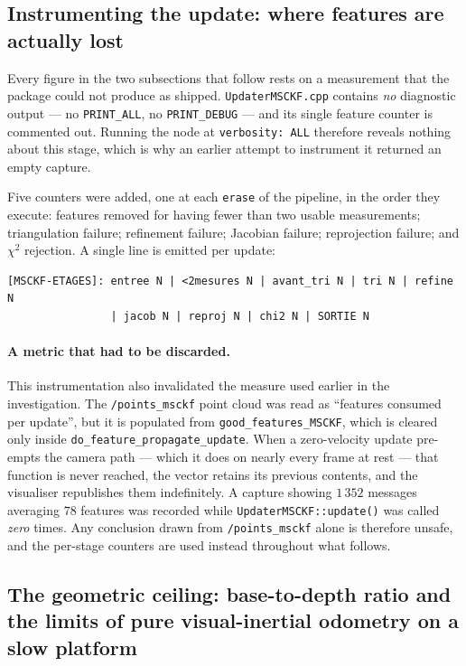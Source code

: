 \subsection{Instrumenting the update: where features are actually lost}
\label{ssec:etages}

Every figure in the two subsections that follow rests on a measurement that
the package could not produce as shipped. \texttt{UpdaterMSCKF.cpp} contains
\emph{no} diagnostic output --- no \texttt{PRINT\_ALL}, no
\texttt{PRINT\_DEBUG} --- and its single feature counter is commented out.
Running the node at \texttt{verbosity: ALL} therefore reveals nothing about
this stage, which is why an earlier attempt to instrument it returned an empty
capture.

Five counters were added, one at each \texttt{erase} of the pipeline, in the
order they execute: features removed for having fewer than two usable
measurements; triangulation failure; refinement failure; Jacobian failure;
reprojection failure; and $\chi^{2}$ rejection. A single line is emitted per
update:

\begin{verbatim}
[MSCKF-ETAGES]: entree N | <2mesures N | avant_tri N | tri N | refine N
                | jacob N | reproj N | chi2 N | SORTIE N
\end{verbatim}

\paragraph{A metric that had to be discarded.} This instrumentation also
invalidated the measure used earlier in the investigation. The
\texttt{/points\_msckf} point cloud was read as ``features consumed per
update'', but it is populated from \texttt{good\_features\_MSCKF}, which is
cleared only inside \texttt{do\_feature\_propagate\_update}. When a
zero-velocity update pre-empts the camera path --- which it does on nearly
every frame at rest --- that function is never reached, the vector retains its
previous contents, and the visualiser republishes them indefinitely. A capture
showing $1\,352$ messages averaging $78$ features was recorded while
\texttt{UpdaterMSCKF::update()} was called \emph{zero} times. Any conclusion
drawn from \texttt{/points\_msckf} alone is therefore unsafe, and the
per-stage counters are used instead throughout what follows.

\subsection{The geometric ceiling: base-to-depth ratio and the limits of pure
visual-inertial odometry on a slow platform}
\label{ssec:parallaxe}


